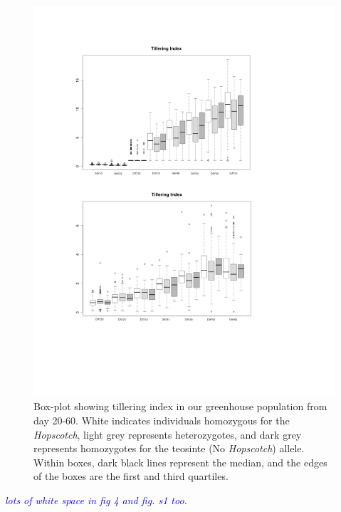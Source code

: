 \documentclass[11pt]{article}
\newcommand{\jri}[1]{\textcolor{blue}{ \emph{\scriptsize  #1}} }
\begin{document}
\begin{linenumbers}
\begin{flushleft}
\begin{figure}[!t]
  \begin{center}
   \includegraphics[width=150mm]{Fig4Boxplots.pdf}
    \caption{Box-plot showing tillering index in our greenhouse population from day 20-60. White indicates individuals homozygous for the \emph{Hopscotch}, light grey represents heterozygotes, and dark grey represents homozygotes for the teosinte (No \emph{Hopscotch}) allele. Within boxes, dark black lines represent the median, and the edges of the boxes are the first and third quartiles.} 
\label{Fig4Boxplots}
  \end{center}
\end{figure}
\jri{lots of white space in fig 4 and fig. s1 too.} 

\end{flushleft}
\end{linenumbers}
\end{document}
